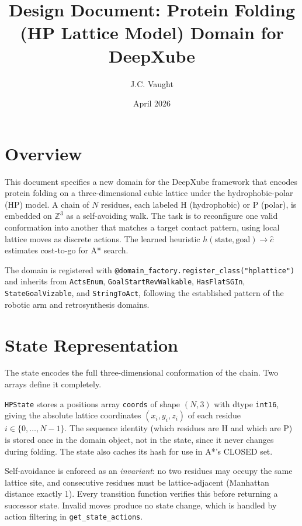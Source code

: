 \documentclass[11pt]{article}
\title{\textbf{Design Document: Protein Folding (HP Lattice Model) Domain for DeepXube}}
\author{J.C. Vaught}
\date{April 2026}
\begin{document}
\maketitle

\section{Overview}

This document specifies a new domain for the DeepXube framework that encodes protein folding on a three-dimensional cubic lattice under the hydrophobic-polar (HP) model. A chain of $N$ residues, each labeled H (hydrophobic) or P (polar), is embedded on $\mathbb{Z}^3$ as a self-avoiding walk. The task is to reconfigure one valid conformation into another that matches a target contact pattern, using local lattice moves as discrete actions. The learned heuristic $h(\text{state}, \text{goal}) \to \hat{c}$ estimates cost-to-go for A* search.

The domain is registered with \texttt{@domain\_factory.register\_class("hplattice")} and inherits from \texttt{ActsEnum}, \texttt{GoalStartRevWalkable}, \texttt{HasFlatSGIn}, \texttt{StateGoalVizable}, and \texttt{StringToAct}, following the established pattern of the robotic arm and retrosynthesis domains.


\section{State Representation}

The state encodes the full three-dimensional conformation of the chain. Two arrays define it completely.

\texttt{HPState} stores a positions array \texttt{coords} of shape $(N, 3)$ with dtype \texttt{int16}, giving the absolute lattice coordinates $(x_i, y_i, z_i)$ of each residue $i \in \{0, \ldots, N{-}1\}$. The sequence identity (which residues are H and which are P) is stored once in the domain object, not in the state, since it never changes during folding. The state also caches its hash for use in A*'s CLOSED set.

Self-avoidance is enforced as an \textit{invariant}: no two residues may occupy the same lattice site, and consecutive residues must be lattice-adjacent (Manhattan distance exactly 1). Every transition function verifies this before returning a successor state. Invalid moves produce no state change, which is handled by action filtering in \texttt{get\_state\_actions}.
\end{document}
